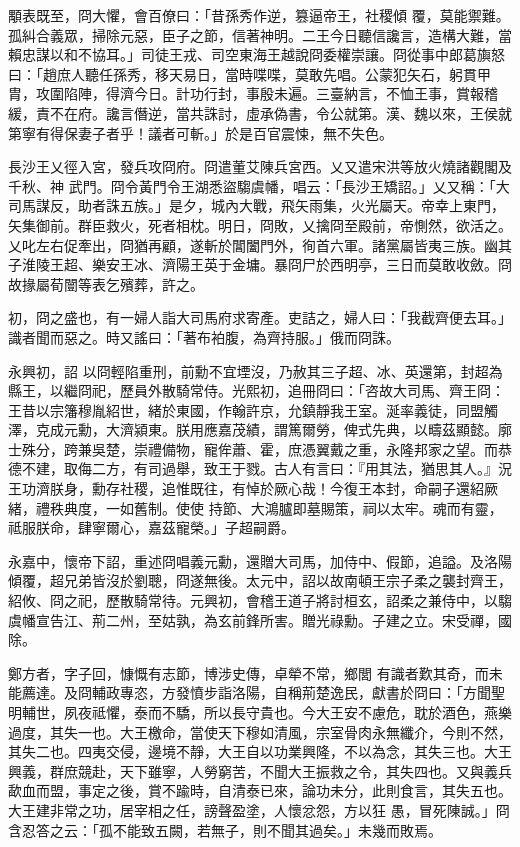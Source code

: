 \begin{pinyinscope}
 顒表既至，冏大懼，會百僚曰：「昔孫秀作逆，篡逼帝王，社稷傾
 覆，莫能禦難。孤糾合義眾，掃除元惡，臣子之節，信著神明。二王今日聽信讒言，造構大難，當賴忠謀以和不協耳。」司徒王戎、司空東海王越說冏委權崇讓。冏從事中郎葛旟怒曰：「趙庶人聽任孫秀，移天易日，當時喋喋，莫敢先唱。公蒙犯矢石，躬貫甲胄，攻圍陷陣，得濟今日。計功行封，事殷未遍。三臺納言，不恤王事，賞報稽緩，責不在府。讒言僭逆，當共誅討，虛承偽書，令公就第。漢、魏以來，王侯就第寧有得保妻子者乎！議者可斬。」於是百官震悚，無不失色。



 長沙王乂徑入宮，發兵攻冏府。冏遣董艾陳兵宮西。乂又遣宋洪等放火燒諸觀閣及千秋、神
 武門。冏令黃門令王湖悉盜騶虞幡，唱云：「長沙王矯詔。」乂又稱：「大司馬謀反，助者誅五族。」是夕，城內大戰，飛矢雨集，火光屬天。帝幸上東門，矢集御前。群臣救火，死者相枕。明日，冏敗，乂擒冏至殿前，帝惻然，欲活之。乂叱左右促牽出，冏猶再顧，遂斬於閶闔門外，徇首六軍。諸黨屬皆夷三族。幽其子淮陵王超、樂安王冰、濟陽王英于金墉。暴冏尸於西明亭，三日而莫敢收斂。冏故掾屬荀闓等表乞殯葬，許之。



 初，冏之盛也，有一婦人詣大司馬府求寄產。吏詰之，婦人曰：「我截齊便去耳。」識者聞而惡之。時又謠曰：「著布袙腹，為齊持服。」俄而冏誅。



 永興初，詔
 以冏輕陷重刑，前勳不宜堙沒，乃赦其三子超、冰、英還第，封超為縣王，以繼冏祀，歷員外散騎常侍。光熙初，追冊冏曰：「咨故大司馬、齊王冏：王昔以宗籓穆胤紹世，緒於東國，作翰許京，允鎮靜我王室。涎率義徒，同盟觸澤，克成元勳，大濟潁東。朕用應嘉茂績，謂篤爾勞，俾式先典，以疇茲顯懿。廓士殊分，跨兼吳楚，崇禮備物，寵侔蕭、霍，庶憑翼戴之重，永隆邦家之望。而恭德不建，取侮二方，有司過舉，致王于戮。古人有言曰：『用其法，猶思其人。』況王功濟朕身，勳存社稷，追惟既往，有悼於厥心哉！今復王本封，命嗣子還紹厥緒，禮秩典度，一如舊制。使使
 持節、大鴻臚即墓賜策，祠以太牢。魂而有靈，祗服朕命，肆寧爾心，嘉茲寵榮。」子超嗣爵。



 永嘉中，懷帝下詔，重述冏唱義元勳，還贈大司馬，加侍中、假節，追謚。及洛陽傾覆，超兄弟皆沒於劉聰，冏遂無後。太元中，詔以故南頓王宗子柔之襲封齊王，紹攸、冏之祀，歷散騎常待。元興初，會稽王道子將討桓玄，詔柔之兼侍中，以騶虞幡宣告江、荊二州，至姑孰，為玄前鋒所害。贈光祿勳。子建之立。宋受禪，國除。



 鄭方者，字子回，慷慨有志節，博涉史傳，卓犖不常，鄉閭
 有識者歎其奇，而未能薦達。及冏輔政專恣，方發憤步詣洛陽，自稱荊楚逸民，獻書於冏曰：「方聞聖明輔世，夙夜祗懼，泰而不驕，所以長守貴也。今大王安不慮危，耽於酒色，燕樂過度，其失一也。大王檄命，當使天下穆如清風，宗室骨肉永無纖介，今則不然，其失二也。四夷交侵，邊境不靜，大王自以功業興隆，不以為念，其失三也。大王興義，群庶競赴，天下雖寧，人勞窮苦，不聞大王振救之令，其失四也。又與義兵歃血而盟，事定之後，賞不踰時，自清泰已來，論功未分，此則食言，其失五也。大王建非常之功，居宰相之任，謗聲盈塗，人懷忿怨，方以狂
 愚，冒死陳誠。」冏含忍答之云：「孤不能致五闕，若無子，則不聞其過矣。」未幾而敗焉。




\end{pinyinscope}
